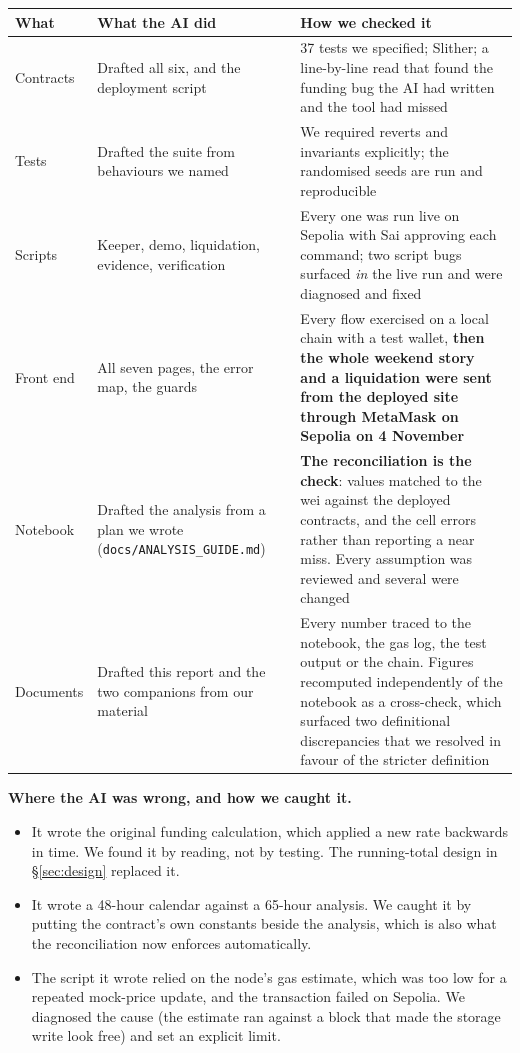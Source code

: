 \documentclass[11pt,a4paper]{article}
\begin{document}
\begin{center}
\small
\begin{tabular}{@{}p{3.8cm}p{5.6cm}p{5.8cm}@{}}
\toprule
\textbf{What} & \textbf{What the AI did} & \textbf{How we checked it} \\
\midrule
Contracts & Drafted all six, and the deployment script & 37 tests we specified; Slither; a line-by-line read that found the funding bug the AI had written and the tool had missed \\
Tests & Drafted the suite from behaviours we named & We required reverts and invariants explicitly; the randomised seeds are run and reproducible \\
Scripts & Keeper, demo, liquidation, evidence, verification & Every one was run live on Sepolia with Sai approving each command; two script bugs surfaced \emph{in} the live run and were diagnosed and fixed \\
Front end & All seven pages, the error map, the guards & Every flow exercised on a local chain with a test wallet, \textbf{then the whole weekend story and a liquidation were sent from the deployed site through MetaMask on Sepolia on 4 November} \\
Notebook & Drafted the analysis from a plan we wrote (\texttt{docs/ANALYSIS\_GUIDE.md}) & \textbf{The reconciliation is the check}: \reconCount{} values matched to the wei against the deployed contracts, and the cell errors rather than reporting a near miss. Every assumption was reviewed and several were changed \\
Documents & Drafted this report and the two companions from our material & Every number traced to the notebook, the gas log, the test output or the chain. Figures recomputed independently of the notebook as a cross-check, which surfaced two definitional discrepancies that we resolved in favour of the stricter definition \\
\bottomrule
\end{tabular}
\end{center}

\textbf{Where the AI was wrong, and how we caught it.}

\begin{itemize}
  \item It wrote the original funding calculation, which applied a new rate backwards in time. We
  found it by reading, not by testing. The running-total design in \S\ref{sec:design} replaced it.
  \item It wrote a 48-hour calendar against a 65-hour analysis. We caught it by putting the
  contract's own constants beside the analysis, which is also what the reconciliation now enforces
  automatically.
  \item The script it wrote relied on the node's gas estimate, which was too low for a repeated
  mock-price update, and the transaction failed on Sepolia. We diagnosed the cause (the estimate ran
  against a block that made the storage write look free) and set an explicit limit.
\end{itemize}
\end{document}
